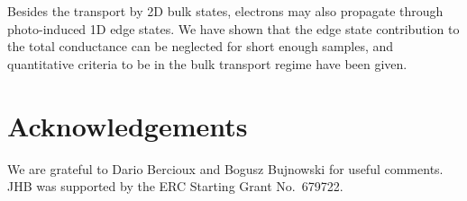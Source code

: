 \documentclass[aps,prb,showpacs,superscriptaddress,twocolumn,10pt,floatfix]{revtex4-1}
\begin{document}
Besides the transport by 2D bulk states, electrons may also propagate through photo-induced 1D edge states. We have shown that the edge state contribution to the total conductance can be neglected for short enough samples, and quantitative criteria to be in the bulk transport regime have been given.  

\medskip

\section*{Acknowledgements}

We are grateful to Dario Bercioux and Bogusz Bujnowski for useful comments. JHB was supported by the ERC Starting Grant No.~679722.




\end{document}
